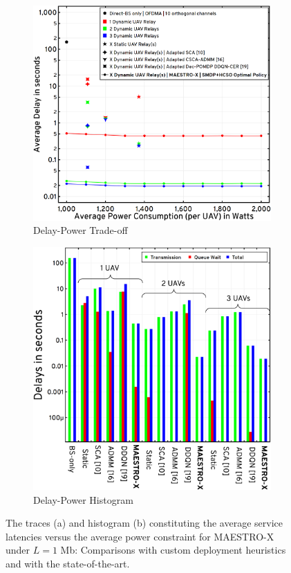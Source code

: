 \documentclass[12pt, draftcls, onecolumn]{IEEEtran}
\theoremstyle{plain}
\theoremstyle{definition}
\theoremstyle{remark}
\begin{document}
\begin{figure} [t]
     \begin{subfigure}{0.53\linewidth}
         \centering
         \includegraphics[width=0.9\linewidth]{figs/Delay_Power_Tradeoff_1Mb.png}
         \caption{Delay-Power Trade-off}
         \label{F8}
     \end{subfigure}
     \begin{subfigure}{0.47\linewidth}
         \centering
         \includegraphics[width=0.9\linewidth]{figs/Delay_Power_Histogram_1Mb.png}
         \caption{Delay-Power Histogram}
         \label{F9}
     \end{subfigure}
     \vspace{-2mm}
     \caption{The traces (a) and histogram (b) constituting the average service latencies versus the average power constraint for MAESTRO-X under $L{=}1$ Mb: Comparisons with custom deployment heuristics and with the state-of-the-art.}
\end{figure}
\end{document}
